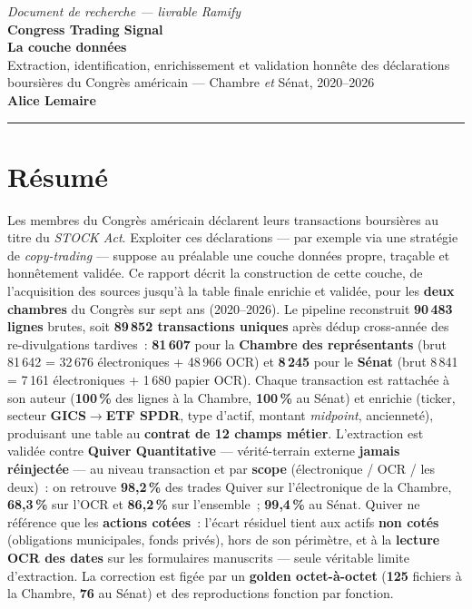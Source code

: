 \documentclass[11pt,a4paper]{article}
\begin{document}
\begin{center}
{\small\itshape Document de recherche — livrable Ramify}\\[3pt]
{\Huge\bfseries Congress Trading Signal}\\[3pt]
{\Large\bfseries La couche données}\\[5pt]
{\normalsize Extraction, identification, enrichissement et validation honnête des déclarations\\
boursières du Congrès américain — Chambre \emph{et} Sénat, 2020--2026}\\[6pt]
{\large\bfseries Alice Lemaire}\quad\textperiodcentered\quad{\small\today}
\end{center}
\vspace{2pt}\hrule\vspace{6pt}

\section*{Résumé}
Les membres du Congrès américain déclarent leurs transactions boursières au titre du \emph{STOCK Act}.
Exploiter ces déclarations — par exemple via une stratégie de \emph{copy-trading} — suppose au préalable
une couche données propre, traçable et honnêtement validée. Ce rapport décrit la construction de cette
couche, de l'acquisition des sources jusqu'à la table finale enrichie et validée, pour les \textbf{deux
chambres} du Congrès sur sept ans (2020--2026). Le pipeline reconstruit \textbf{90\,483 lignes} brutes, soit
\textbf{89\,852 transactions uniques} après dédup cross-année des re-divulgations tardives~: \textbf{81\,607}
pour la \textbf{Chambre des représentants} (brut 81\,642 = 32\,676 électroniques + 48\,966 OCR) et
\textbf{8\,245} pour le \textbf{Sénat} (brut 8\,841 = 7\,161 électroniques + 1\,680 papier OCR). Chaque transaction est
rattachée à son auteur (\textbf{100\,\%} des lignes à la Chambre, \textbf{100\,\%} au Sénat) et enrichie
(ticker, secteur \textbf{GICS$\rightarrow$ETF SPDR}, type d'actif, montant \emph{midpoint}, ancienneté),
produisant une table au \textbf{contrat de 12 champs métier}. L'extraction est validée contre \textbf{Quiver
Quantitative} — vérité-terrain externe \textbf{jamais réinjectée} — au niveau transaction et par
\textbf{scope} (électronique / OCR / les deux)~: on retrouve \textbf{98,2\,\%} des trades Quiver sur
l'électronique de la Chambre, \textbf{68,3\,\%} sur l'OCR et \textbf{86,2\,\%} sur l'ensemble~;
\textbf{99,4\,\%} au Sénat. Quiver ne référence que les \textbf{actions cotées}~: l'écart résiduel tient
aux actifs \textbf{non cotés} (obligations municipales, fonds privés), hors de son périmètre, et à la
\textbf{lecture OCR des dates} sur les formulaires manuscrits — seule véritable limite d'extraction. La
correction est figée par un \textbf{golden octet-à-octet} (\textbf{125} fichiers à la Chambre, \textbf{76}
au Sénat) et des reproductions fonction par fonction.
\end{document}
